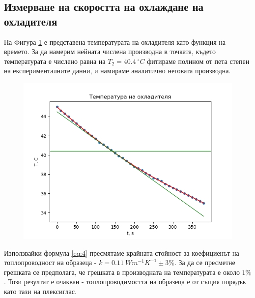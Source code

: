 \documentclass[reprint,amsmath,amssymb,aps,floatfix]{revtex4-2}
\newcommand{\degree}{^{\circ}}
\begin{document}
\subsection{Измерване на скоростта на охлаждане на охладителя}

На Фигура \ref{fig:2} е представена температурата на охладителя като функция на времето. За да намерим нейната числена производна в точката, където температурата е числено равна на $T_2 = 40.4 \ \degree C$ фитираме полином от пета степен на експерименталните данни, и намираме аналитично неговата производна.  

\begin{figure}[ht]
    \centering
    \includegraphics[width=\columnwidth, keepaspectratio=true]{graph_cool.png}
    \caption{} 
    \label{fig:2}
\end{figure}

Използвайки формула \eqref{eq:4} пресмятаме крайната стойност за коефициенът на топлопроводност на образеца - $k = 0.11 \ \si{Wm^{-1}K^{-1}} \pm 3\%$.  За да се пресметне грешката се предполага, че грешката в производната на температурата е около $1\%$. Този резултат е очакван - топлопроводимостта на образеца е от същия порядък като тази на плексиглас. 
\end{document}
